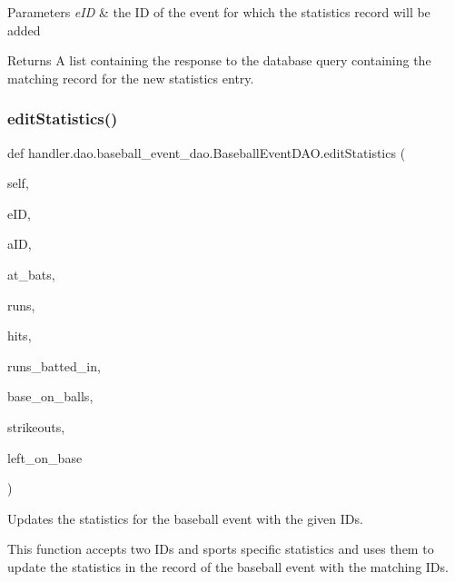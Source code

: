 \begin{DoxyParams}{Parameters}
{\em e\+ID} & the ID of the event for which the statistics record will be added\\
\hline
\end{DoxyParams}
\begin{DoxyReturn}{Returns}
A list containing the response to the database query containing the matching record for the new statistics entry. 
\end{DoxyReturn}
\mbox{\label{classhandler_1_1dao_1_1baseball__event__dao_1_1_baseball_event_d_a_o_a679084f6b576917c7ad24055e0200873}} 
\subsubsection{\texorpdfstring{edit\+Statistics()}{editStatistics()}}
{\footnotesize\ttfamily def handler.\+dao.\+baseball\+\_\+event\+\_\+dao.\+Baseball\+Event\+D\+A\+O.\+edit\+Statistics (\begin{DoxyParamCaption}\item[{}]{self,  }\item[{}]{e\+ID,  }\item[{}]{a\+ID,  }\item[{}]{at\+\_\+bats,  }\item[{}]{runs,  }\item[{}]{hits,  }\item[{}]{runs\+\_\+batted\+\_\+in,  }\item[{}]{base\+\_\+on\+\_\+balls,  }\item[{}]{strikeouts,  }\item[{}]{left\+\_\+on\+\_\+base }\end{DoxyParamCaption})}



Updates the statistics for the baseball event with the given I\+Ds. 

This function accepts two I\+Ds and sports specific statistics and uses them to update the statistics in the record of the baseball event with the matching I\+Ds.


